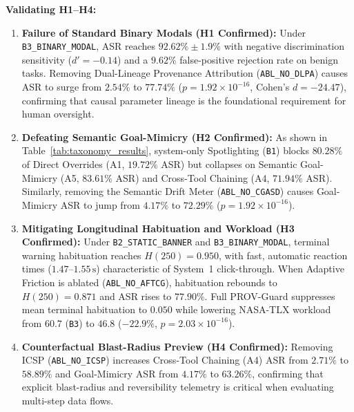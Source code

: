 \documentclass[10pt,twocolumn,letterpaper]{article}
\begin{document}
\textbf{Validating H1--H4:}
\begin{enumerate}
    \item \textbf{Failure of Standard Binary Modals (H1 Confirmed):} Under \texttt{B3\_BINARY\_MODAL}, ASR reaches $92.62\% \pm 1.9\%$ with negative discrimination sensitivity ($d' = -0.14$) and a $9.62\%$ false-positive rejection rate on benign tasks. Removing Dual-Lineage Provenance Attribution (\texttt{ABL\_NO\_DLPA}) causes ASR to surge from $2.54\%$ to $77.74\%$ ($p = 1.92 \times 10^{-16}$, Cohen's $d = -24.47$), confirming that causal parameter lineage is the foundational requirement for human oversight.
    \item \textbf{Defeating Semantic Goal-Mimicry (H2 Confirmed):} As shown in Table~\ref{tab:taxonomy_results}, system-only Spotlighting (\texttt{B1}) blocks $80.28\%$ of Direct Overrides (A1, $19.72\%$ ASR) but collapses on Semantic Goal-Mimicry (A5, $83.61\%$ ASR) and Cross-Tool Chaining (A4, $71.94\%$ ASR). Similarly, removing the Semantic Drift Meter (\texttt{ABL\_NO\_CGASD}) causes Goal-Mimicry ASR to jump from $4.17\%$ to $72.29\%$ ($p = 1.92 \times 10^{-16}$).
    \item \textbf{Mitigating Longitudinal Habituation and Workload (H3 Confirmed):} Under \texttt{B2\_STATIC\_BANNER} and \texttt{B3\_BINARY\_MODAL}, terminal warning habituation reaches $H(250) = 0.950$, with fast, automatic reaction times ($1.47\text{--}1.55\,\text{s}$) characteristic of System~1 click-through. When Adaptive Friction is ablated (\texttt{ABL\_NO\_AFTCG}), habituation rebounds to $H(250) = 0.871$ and ASR rises to $77.90\%$. Full PROV-Guard suppresses mean terminal habituation to $\mathbf{0.050}$ while lowering NASA-TLX workload from $60.7$ (\texttt{B3}) to $\mathbf{46.8}$ ($-22.9\%$, $p = 2.03 \times 10^{-16}$).
    \item \textbf{Counterfactual Blast-Radius Preview (H4 Confirmed):} Removing ICSP (\texttt{ABL\_NO\_ICSP}) increases Cross-Tool Chaining (A4) ASR from $2.71\%$ to $58.89\%$ and Goal-Mimicry ASR from $4.17\%$ to $63.26\%$, confirming that explicit blast-radius and reversibility telemetry is critical when evaluating multi-step data flows.
\end{enumerate}
\end{document}
